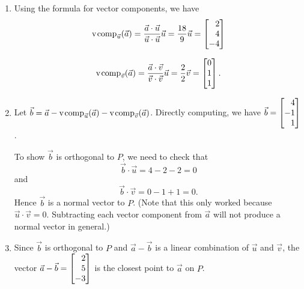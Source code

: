 \begin{exercises}
\begin{problist}
\begin{solution}
			\begin{enumerate}
				\item Using the formula for vector components, we have 
	\[
	\Comp_{\vec u}(\vec a) = \frac{\vec a \cdot \vec u}{\vec u \cdot \vec u}\vec u = \frac{18}{9}\vec u = \mat{2\\4\\-4}
	\]
	
	\[
	\Comp_{\vec v}(\vec a) = \frac{\vec a \cdot \vec v}{\vec v \cdot \vec v}\vec u = \frac{2}{2}\vec v = \mat{0\\1\\1}. 
	\]
	
\item Let $\vec b = \vec a-\operatorname{\operatorname{v\hspace{1pt}comp}}_{\vec u}(\vec a)-\operatorname{\operatorname{v\hspace{1pt}comp}}_{\vec v}(\vec a)$. Directly computing, we have $\vec b = \mat{ 4 \\-1 \\1 }$.

	To show $\vec b$ is orthogonal to $P$, we need to check that \[\vec b \cdot \vec u =  4-2-2 = 0\] and \[
\vec b \cdot \vec v = 0-1+1 = 0.\]	
Hence $\vec b$ is a normal vector to $P$. (Note that this only worked
because $\vec u\cdot \vec v = 0$. Subtracting each vector component from
					$\vec a$ will not produce a normal vector in general.)

\item Since $\vec b$ is orthogonal to $P$ and $\vec a - \vec b$ is a linear combination of $\vec u$ and $\vec v$, the vector $\vec a - \vec b=\mat {2\\5\\-3}$ is the closest point to $\vec a$ on $P$. 
			\end{enumerate}
		\end{solution}


	\end{problist}
\end{exercises}
